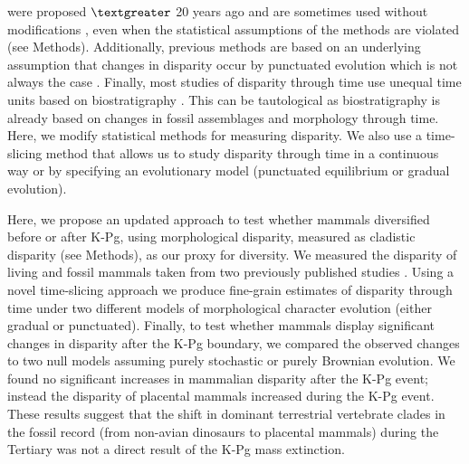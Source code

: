 \documentclass[12pt,letterpaper]{article}
\begin{document}
\begin{enumerate}
    were proposed $\textgreater$ 20 years ago \citep{Foote01071994,Wills1994} and are sometimes used without modifications \citep[e.g.,][]{brusatte50,Brusatte12092008,cisneros2010,thorneresetting2011,prentice2011,brusattedinosaur2012,toljagictriassic-jurassic2013,ruta2013,bentonmodels2014,bensonfaunal2014}, even when the statistical assumptions of the methods are violated (see Methods).
    Additionally, previous methods are based on an underlying assumption that changes in disparity occur by punctuated evolution \citep[e.g.][]{Wesley-Hunt2005} which is not always the case \citep{Hunt21042015}.
    Finally, most studies of disparity through time use unequal time units based on biostratigraphy \citep{Brusatte12092008,brusattedinosaur2012,toljagictriassic-jurassic2013}. 
    This can be tautological as biostratigraphy is already based on changes in fossil assemblages and morphology through time.
    Here, we modify statistical methods for measuring disparity.
    We also use a time-slicing method that allows us to study disparity through time in a continuous way or by specifying an evolutionary model (punctuated equilibrium or gradual evolution).
  \end{enumerate}

Here, we propose an updated approach to test whether mammals diversified before or after K-Pg, using morphological disparity, measured as cladistic disparity (see Methods), as our proxy for diversity.
We measured the disparity of living and fossil mammals taken from two previously published studies \citep{Slater2012MEE,beckancient2014}. %
Using a novel time-slicing approach we produce fine-grain estimates of disparity through time under two different models of morphological character evolution (either gradual or punctuated). 
Finally, to test whether mammals display significant changes in disparity after the K-Pg boundary, we compared the observed changes to two null models assuming purely stochastic or purely Brownian evolution. 
We found no significant increases in mammalian disparity after the K-Pg event; instead the disparity of placental mammals increased during the K-Pg event. 
These results suggest that the shift in dominant terrestrial vertebrate clades in the fossil record (from non-avian dinosaurs to placental mammals) during the Tertiary was not a direct result of the K-Pg mass extinction.
\end{document}
